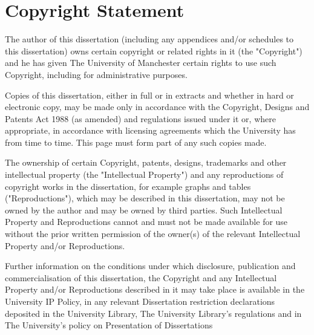 \chapter*{Copyright Statement}


The author of this dissertation (including any appendices and/or schedules to this dissertation) owns certain copyright or related rights in it (the "Copyright") and he has given The University of Manchester certain rights to use such Copyright, including for administrative purposes.

Copies of this dissertation, either in full or in extracts and whether in hard or electronic copy, may be made only in accordance with the Copyright, Designs and Patents Act 1988 (as amended) and regulations issued under it or, where appropriate, in accordance with licensing agreements which the University has from time to time. This page must form part of any such copies made.

The ownership of certain Copyright, patents, designs, trademarks and other intellectual property (the "Intellectual Property") and any reproductions of copyright works in the dissertation, for example graphs and tables ("Reproductions"), which may be described in this dissertation, may not be owned by the author and may be owned by third parties. Such Intellectual Property and Reproductions cannot and must not be made available for use without the prior written permission of the owner(s) of the relevant Intellectual Property and/or Reproductions.

Further information on the conditions under which disclosure, publication and commercialisation of this dissertation, the Copyright and any Intellectual Property and/or Reproductions described in it may take place is available in the University IP Policy, in any relevant Dissertation restriction declarations deposited in the University Library, The University Library's regulations and in The University's policy on Presentation of Dissertations

\cleardoublepage

\endinput
